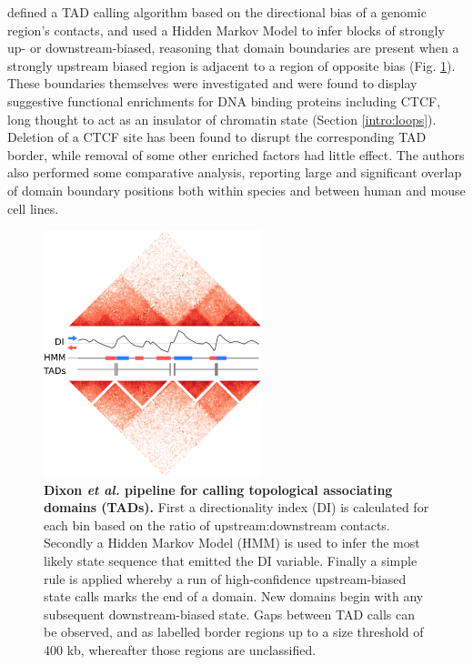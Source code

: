 \documentclass[a4paper,11pt,oneside]{book}
\begin{document}
\citet{Dixon2012} defined a TAD calling algorithm based on the directional bias of a genomic region's contacts, and used a Hidden Markov Model to infer blocks of strongly up- or downstream-biased, reasoning that domain boundaries are present when a strongly upstream biased region is adjacent to a region of opposite bias (Fig. \ref{fig:dicalc}). These boundaries themselves were investigated and were found to display suggestive functional enrichments for DNA binding proteins including CTCF, long thought to act as an insulator of chromatin state (Section \ref{intro:loops}). Deletion of a  CTCF site has been found to disrupt the corresponding TAD border, while removal of some other enriched factors had little effect.\cite{Nora2012, Zuin2013, Narendra2015}
The authors also performed some comparative analysis, reporting large and significant overlap of domain boundary positions both within species and between human and mouse cell lines.\cite{Dixon2012}

\begin{figure}
\begin{center}
\includegraphics[width=2.5in]{figs/di_example.png}
\captionsetup{width=\textwidth}
\caption[Dixon \emph{et al.} pipeline for calling topological associating domains (TADs).]{ {\bf Dixon \emph{et al.} pipeline for calling topological associating domains (TADs).} First a directionality index (DI) is calculated for each bin based on the ratio of upstream:downstream contacts. Secondly a Hidden Markov Model (HMM) is used to infer the most likely state sequence that emitted the DI variable. Finally a simple rule is applied whereby a run of high-confidence upstream-biased state calls marks the end of a domain. New domains begin with any subsequent downstream-biased state. Gaps between TAD calls can be observed, and as labelled border regions up to a size threshold of 400 kb, whereafter those regions are unclassified.\cite{Dixon2012}
}\label{fig:dicalc}
\end{center}
\end{figure} 
\end{document}

